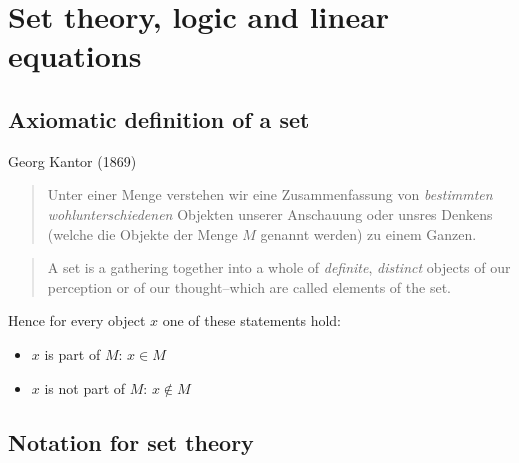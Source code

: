 \documentclass[a4paper,landscape,twocolumn]{article}
\begin{document}
\section{Set theory, logic and linear equations}
\subsection{Axiomatic definition of a set}

Georg Kantor (1869)
\begin{quote}
  Unter einer Menge verstehen wir eine Zusammenfassung von \emph{bestimmten}
  \emph{wohlunterschiedenen} Objekten unserer Anschauung oder unsres Denkens
  (welche die Objekte der Menge $M$ genannt werden) zu einem Ganzen.
\end{quote}
\begin{quote}
  A set is a gathering together into a whole of \emph{definite}, \emph{distinct} objects
  of our perception or of our thought--which are called elements of the set.
\end{quote}

Hence for every object $x$ one of these statements hold:
\begin{itemize}
    \item $x$ is part of $M$: $x \in M$
    \item $x$ is not part of $M$: $x \not\in M$
\end{itemize}

\subsection{Notation for set theory}
\end{document}
